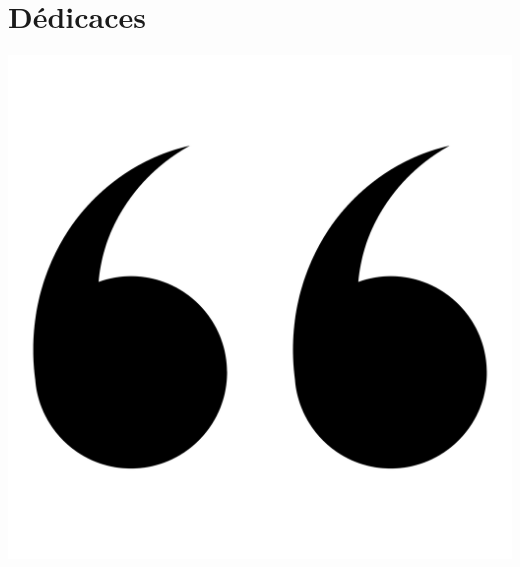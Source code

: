 \chapter*{Dédicaces}



\newcommand{\dedicationquote}[1]{%
    \begin{quote}
    \begin{center}
        \large\itshape\color{dedicationquote}
        #1
    \end{center}
    \end{quote}
}


\newcommand{\signature}[1]{%
    \begin{flushright}
        \color{signature}
        \emph{#1}
    \end{flushright}
}
\vspace{1.5cm}
\hspace{0.4cm}
\includegraphics[scale=0.02]{Images/quote2.png}
\hspace{5cm}
    
